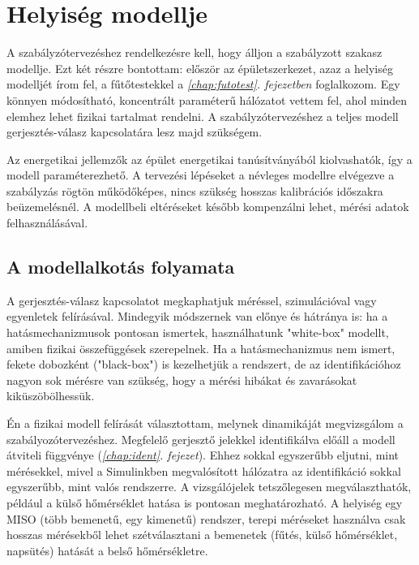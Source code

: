 \chapter{Helyiség modellje}\label{chap:helyiseg}


A szabályzótervezéshez rendelkezésre kell, hogy álljon a szabályzott szakasz modellje. Ezt két részre bontottam: először az épületszerkezet, azaz a helyiség modelljét írom fel, a fűtőtestekkel a \textit{\ref{chap:futotest}. fejezetben} foglalkozom. Egy könnyen módosítható, koncentrált paraméterű hálózatot vettem fel, ahol minden elemhez lehet fizikai tartalmat rendelni. A szabályzótervezéshez a teljes modell gerjesztés-válasz kapcsolatára lesz majd szükségem.

Az energetikai jellemzők az épület energetikai tanúsítványából kiolvashatók, így a modell paraméterezhető. A tervezési lépéseket a névleges modellre elvégezve a szabályzás rögtön működőképes, nincs szükség hosszas kalibrációs időszakra beüzemelésnél. A modellbeli eltéréseket később kompenzálni lehet, mérési adatok felhasználásával.%

\section{A modellalkotás folyamata}
%


A gerjesztés-válasz kapcsolatot megkaphatjuk méréssel, szimulációval vagy egyenletek felírásával. Mindegyik módszernek van előnye és hátránya is:  ha a hatásmechanizmusok pontosan ismertek, használhatunk "white-box" modellt, amiben fizikai összefüggések szerepelnek. Ha a hatásmechanizmus nem ismert, fekete dobozként ("black-box") is kezelhetjük a rendszert, de az identifikációhoz nagyon sok mérésre van szükség, hogy a mérési hibákat és zavarásokat kiküszöbölhessük.%

Én a fizikai modell felírását választottam, melynek dinamikáját megvizsgálom a szabályozótervezéshez. Megfelelő gerjesztő jelekkel identifikálva előáll a modell átviteli függvénye (\textit{\ref{chap:ident}. fejezet}). Ehhez sokkal egyszerűbb eljutni, mint mérésekkel, mivel a Simulinkben megvalósított hálózatra az identifikáció sokkal egyszerűbb, mint valós rendszerre. A vizsgálójelek tetszőlegesen megválaszthatók, például a külső hőmérséklet hatása is pontosan meghatározható. A helyiség egy MISO (több bemenetű, egy kimenetű) rendszer, terepi méréseket használva csak hosszas mérésekből lehet szétválasztani a bemenetek (fűtés, külső hőmérséklet, napsütés) hatását a belső hőmérsékletre.

